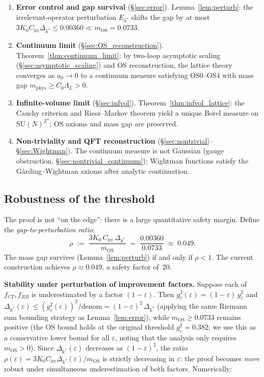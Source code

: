 \documentclass[11pt,a4paper]{amsart}
\theoremstyle{definition}
\newcommand{\SU}{\mathrm{SU}}
\newcommand{\Z}{\mathbb{Z}}
\begin{document}
\begin{enumerate}[label=\textbf{Step \arabic*.}]
\item \textbf{Error control and gap survival} (§\ref{sec:error}).
      Lemma~\ref{lem:perturb}: the irrelevant-operator perturbation
      $E_{k^*}$ shifts the gap by at most $3K_0 C_{\mathrm{irr}} \Delta_{k^*}
      \le 0.00360 \ll m_{\mathrm{OS}} = 0.0733$.

\item \textbf{Continuum limit} (§\ref{sec:OS_reconstruction}).
      Theorem~\ref{thm:continuum_limit}: by two-loop asymptotic scaling
      (§\ref{sec:asymptotic_scaling}) and OS reconstruction, the lattice
      theory converges as $a_0 \to 0$ to a continuum measure satisfying
      OS0--OS4 with mass gap $m_{\mathrm{phys}} \ge C_0 \Lambda_L > 0$.

\item \textbf{Infinite-volume limit} (§\ref{sec:infvol}).
      Theorem~\ref{thm:infvol_lattice}: the Cauchy criterion and
      Riesz--Markov theorem yield a unique Borel measure on
      $\SU(N)^{\Z^4}$; OS axioms and mass gap are preserved.

\item \textbf{Non-triviality and QFT reconstruction}
      (§\ref{sec:nontrivial}--§\ref{sec:Wightman}).
      The continuum measure is not Gaussian (gauge obstruction,
      §\ref{sec:nontrivial_continuum}); Wightman functions satisfy the
      G\aa rding--Wightman axioms after analytic continuation.
\end{enumerate}

\subsection{Robustness of the threshold}
\label{sec:robustness}

The proof is not ``on the edge'': there is a large quantitative safety margin.
Define the \emph{gap-to-perturbation ratio}:
\[
  \rho \;:=\; \frac{3K_0\,C_{\mathrm{irr}}\,\Delta_{k^*}}{m_{\mathrm{OS}}}
  \;=\; \frac{0.00360}{0.0733} \;\approx\; 0.049.
\]
The mass gap survives (Lemma~\ref{lem:perturb}) if and only if $\rho < 1$.
The current construction achieves $\rho \approx 0.049$, a safety factor of~$20$.

\textbf{Stability under perturbation of improvement factors.}
Suppose each of $f_{CT}, f_{RB}$ is underestimated by a factor $(1-\varepsilon)$.
Then $g^2_c(\varepsilon) = (1-\varepsilon)\,g^2_c$ and
$\Delta_{k^*}(\varepsilon) \le (g^2_c(\varepsilon))^2/\mathrm{denom}
= (1{-}\varepsilon)^2\,\Delta_{k^*}$
(applying the same Riemann sum bounding strategy as Lemma~\ref{lem:error}),
while $m_{\mathrm{OS}} \ge 0.0733$ remains positive (the OS bound holds at the
original threshold $g^2_c = 0.382$; we use this as a conservative lower bound
for all $\varepsilon$, noting that the analysis only requires $m_{\mathrm{OS}} > 0$).
Since $\Delta_{k^*}(\varepsilon)$ decreases as $(1{-}\varepsilon)^2$, the ratio
$\rho(\varepsilon) = 3K_0 C_{\mathrm{irr}}\Delta_{k^*}(\varepsilon)/m_{\mathrm{OS}}$
is strictly decreasing in $\varepsilon$: the proof becomes \emph{more} robust
under simultaneous underestimation of both factors.  Numerically:
\end{document}
